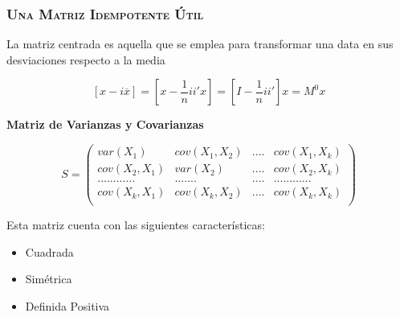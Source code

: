 \documentclass[16.5pt]{beamer}
\begin{document}
{
\begin{frame}
\frametitle{\textsc{\textbf{Una Matriz Idempotente Útil}}}
\hspace*{-5mm}
\vspace*{-5mm} 
\vspace{0.3cm}



  {\color{blue} La matriz centrada es aquella que se emplea para transformar una data en sus desviaciones respecto a la media}

$$[x -i\overline{x}] = [x - \frac{1}{n}ii'x] =  [I - \frac{1}{n}ii']x = M^0x$$

\textbf{Matriz de Varianzas y Covarianzas}

$$S= \begin{pmatrix} var(X_1) & cov(X_1, X_2) & .... & cov(X_1, X_k) \\
cov(X_2, X_1) & var(X_2) & .... & cov(X_2, X_k) \\
............  & .......   & .... & ............ \\
cov(X_k, X_1) & cov(X_k, X_2) & .... & cov(X_k, X_k) \\
\end{pmatrix}$$

 {\color{red}  Esta matriz cuenta con las siguientes características:}
\begin{itemize}
\item Cuadrada
\item Simétrica
\item Definida Positiva
\end{itemize}

\end{frame}
}

\end{document}
